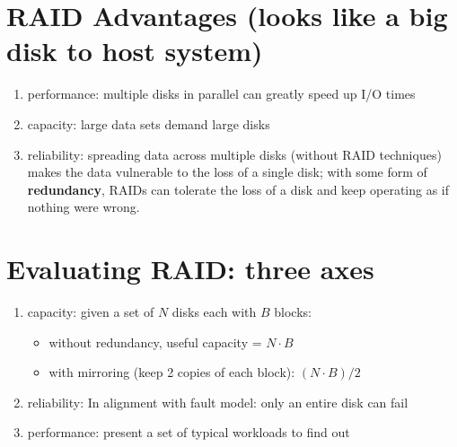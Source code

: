 \section*{RAID Advantages (looks like a big disk to host system)}
\begin{enumerate}
\item performance: multiple disks in parallel can greatly speed up I/O times
\item capacity: large data sets demand large disks
\item reliability: spreading data across multiple disks (without RAID techniques) makes the data vulnerable to the loss of a single disk; with some form of \textbf{redundancy}, RAIDs can tolerate the loss of a disk and keep operating as if nothing were wrong.
\end{enumerate}
\section*{Evaluating RAID: three axes}
\begin{enumerate}
\item capacity: given a set of $N$ disks each with $B$ blocks:
  \begin{itemize}
  \item without redundancy, useful capacity = $N\cdot B$
  \item with mirroring (keep 2 copies of each block): $(N\cdot B)/2$
  \end{itemize}
\item reliability: In alignment with fault model: only an entire disk can fail
\item performance: present a set of typical workloads to find out
\end{enumerate}

